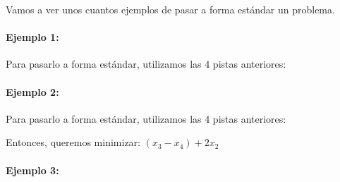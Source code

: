 \begin{example} Vamos a ver unos cuantos ejemplos de pasar a forma estándar un problema.

\paragraph{Ejemplo 1:\\}

\begin{ioprob}
\end{ioprob}


Para pasarlo a forma estándar, utilizamos las 4 pistas anteriores:\\
\begin{ioprob}
\end{ioprob}



\paragraph{Ejemplo 2:\\} 

\begin{ioprob}
\end{ioprob}

Para pasarlo a forma estándar, utilizamos las 4 pistas anteriores:

\begin{ioprob}
\end{ioprob}

Entonces, queremos minimizar: $(x_3 - x_4) + 2x_2$

\begin{ioprob}
\end{ioprob}

\paragraph{Ejemplo 3:\\}


\end{example}
